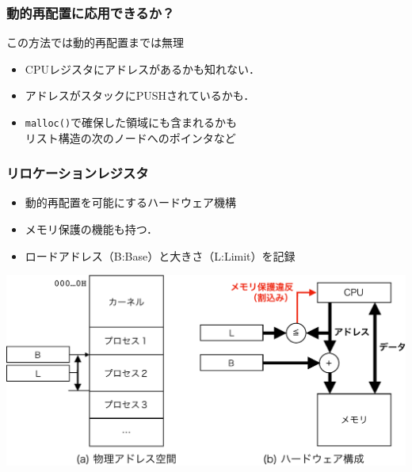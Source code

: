 \documentclass{beamer}                   %
\begin{document}
\begin{frame}
  \frametitle{動的再配置に応用できるか？}
    この方法では動的再配置までは無理
  \begin{itemize}
    \item CPUレジスタにアドレスがあるかも知れない．
    \item アドレスがスタックにPUSHされているかも．
    \item {\tt malloc()}で確保した領域にも含まれるかも\\
      リスト構造の次のノードへのポインタなど
  \end{itemize}
\end{frame}

\begin{frame}
  \frametitle{リロケーションレジスタ}
  \begin{itemize}
    \item 動的再配置を可能にするハードウェア機構
    \item メモリ保護の機能も持つ．
    \item ロードアドレス（B:Base）と大きさ（L:Limit）を記録
  \end{itemize}
  \begin{center}
    \includegraphics[scale=0.60]{Fig/relocationRegister-crop.pdf}
  \end{center}
\end{frame}
\end{document}
